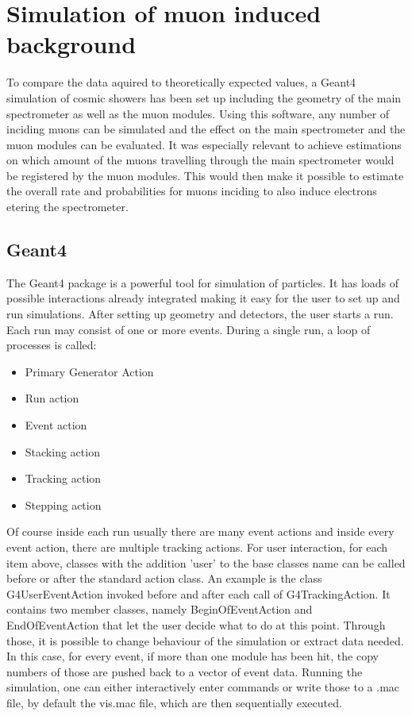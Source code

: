 
\chapter{Simulation of muon induced background}
\label{ch:Simulation of muon induced background}
  To compare the data aquired to theoretically expected values, a Geant4 simulation of cosmic showers has been set up including the geometry of the main spectrometer as well as the muon modules. Using this software, any number of inciding muons can be simulated and the effect on the main spectrometer and the muon modules can be evaluated. It was especially relevant to achieve estimations on which amount of the muons travelling through the main spectrometer would be registered by the muon modules. This would then make it possible to estimate the overall rate and probabilities for muons inciding to also induce electrons etering the spectrometer.
  \section{Geant4}
  \label{ch:Simulation software:sec:Geant4}
  The Geant4 package is a powerful tool for simulation of particles. It has loads of possible interactions already integrated making it easy for the user to set up and run simulations. After setting up geometry and detectors, the user starts a run. Each run may consist of one or more events. During a single run, a loop of processes is called:
  \begin{itemize}	
  	\item Primary Generator Action
  	\item Run action
  	\item Event action
  	\item Stacking action
  	\item Tracking action
  	\item Stepping action
  \end{itemize}
  Of course inside each run usually there are many event actions and inside every event action, there are multiple tracking actions.
  For user interaction, for each item above, classes with the addition 'user' to the base classes name can be called before or after the standard action class. An example is the class G4UserEventAction invoked before and after each call of G4TrackingAction. It contains two member classes, namely BeginOfEventAction and EndOfEventAction that let the user decide what to do at this point. Through those, it is possible to change behaviour of the simulation or extract data needed. In this case, for every event, if more than one module has been hit, the copy numbers of those are pushed back to a vector of event data.  
  Running the simulation, one can either interactively enter commands or write those to a .mac file, by default the vis.mac file, which are then sequentially executed.
  


